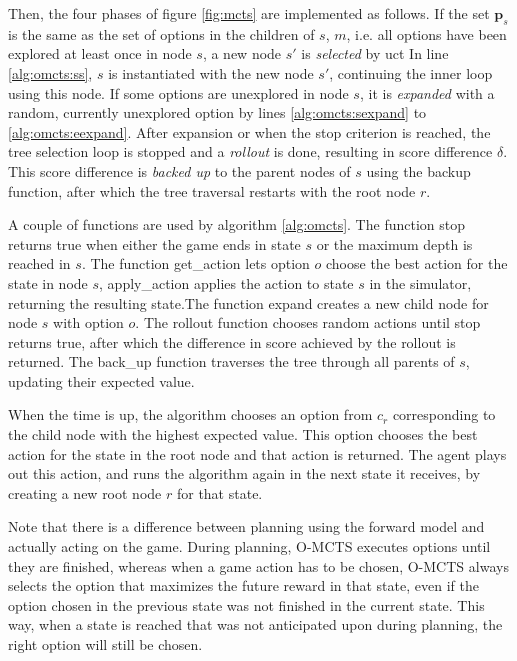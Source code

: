 Then, the four phases of figure \ref{fig:mcts} are implemented as follows.  If
the set $\mathbf{p}_s$ is the same as the set of options in the children of $s$,
$m$, i.e. all options have been explored at least once in node $s$, a new node
$s'$ is \emph{selected} by \textsf{uct} In line \ref{alg:omcts:ss}, $s$ is
instantiated with the new node $s'$, continuing the inner loop using this node.
If some options are unexplored in node $s$, it is \emph{expanded} with a random,
currently unexplored option by lines \ref{alg:omcts:sexpand} to
\ref{alg:omcts:eexpand}. After expansion or when the stop criterion is reached,
the tree selection loop is stopped and a \emph{rollout} is done, resulting in
score difference $\delta$. This score difference is \emph{backed up} to the
parent nodes of $s$ using the backup function, after which the tree traversal
restarts with the root node $r$.

A couple of functions are used by algorithm \ref{alg:omcts}. The function
\textsf{stop} returns true when either the game ends in state $s$ or the maximum
depth is reached in $s$. The function \textsf{get\_action} lets option $o$
choose the best action for the state in node $s$, \textsf{apply\_action} applies
the action to state $s$ in the simulator, returning the resulting state.The
function \textsf{expand} creates a new child node for node $s$ with option $o$.
The \textsf{rollout} function chooses random actions until \textsf{stop} returns
true, after which the difference in score achieved by the rollout is returned.
The \textsf{back\_up} function traverses the tree through all parents of $s$,
updating their expected value.

When the time is up, the algorithm chooses an option from $c_r$ corresponding to
the child node with the highest expected value. This option chooses the best
action for the state in the root node and that action is returned. The agent
plays out this action, and runs the algorithm again in the next state it
receives, by creating a new root node $r$ for that state. 

Note that there is a difference between planning using the forward model and
actually acting on the game. During planning, O-MCTS executes options until they are
finished, whereas when a game action has to be chosen, O-MCTS always selects the
option that maximizes the future reward in that state, even if the option chosen
in the previous state was not finished in the current state. This way, when a
state is reached that was not anticipated upon during planning, the right option
will still be chosen.
